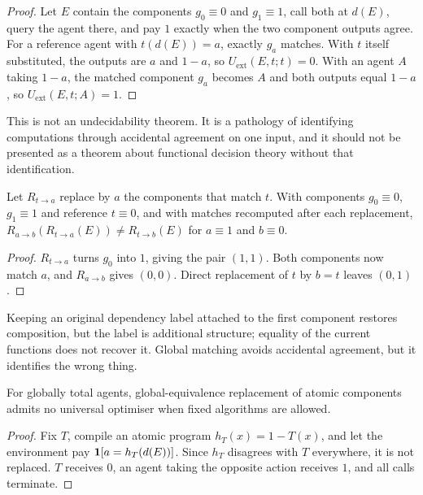 \begin{proof}
Let $E$ contain the components $g_0\equiv0$ and $g_1\equiv1$, call both at $d(E)$, query the agent
there, and pay $1$ exactly when the two component outputs agree. For a reference agent with
$t(d(E))=a$, exactly $g_a$ matches. With $t$ itself substituted, the outputs are $a$ and $1-a$, so
$U_{\mathrm{ext}}(E,t;t)=0$. With an agent $A$ taking $1-a$, the matched component $g_a$ becomes $A$
and both outputs equal $1-a$, so $U_{\mathrm{ext}}(E,t;A)=1$.
\end{proof}

This is not an undecidability theorem. It is a pathology of identifying computations through
accidental agreement on one input, and it should not be presented as a theorem about functional
decision theory without that identification.

\begin{proposition}\label{prop:rematch}
Let $R_{t\to a}$ replace by $a$ the components that match $t$. With components $g_0\equiv0$,
$g_1\equiv1$ and reference $t\equiv0$, and with matches recomputed after each replacement,
$R_{a\to b}(R_{t\to a}(E))\neq R_{t\to b}(E)$ for $a\equiv1$ and $b\equiv0$.
\end{proposition}

\begin{proof}
$R_{t\to a}$ turns $g_0$ into $1$, giving the pair $(1,1)$. Both components now match $a$, and $R_{a\to b}$
gives $(0,0)$. Direct replacement of $t$ by $b=t$ leaves $(0,1)$.
\end{proof}

Keeping an original dependency label attached to the first component restores composition, but the
label is additional structure; equality of the current functions does not recover it. Global
matching avoids accidental agreement, but it identifies the wrong thing.

\begin{theorem}\label{thm:complement}
For globally total agents, global-equivalence replacement of atomic components admits no universal
optimiser when fixed algorithms are allowed.
\end{theorem}

\begin{proof}
Fix $T$, compile an atomic program $h_T(x)=1-T(x)$, and let the environment pay
$\mathbf{1}[a=h_T(d(E))]$. Since $h_T$ disagrees with $T$ everywhere, it is not replaced. $T$ receives $0$,
an agent taking the opposite action receives $1$, and all calls terminate.
\end{proof}

